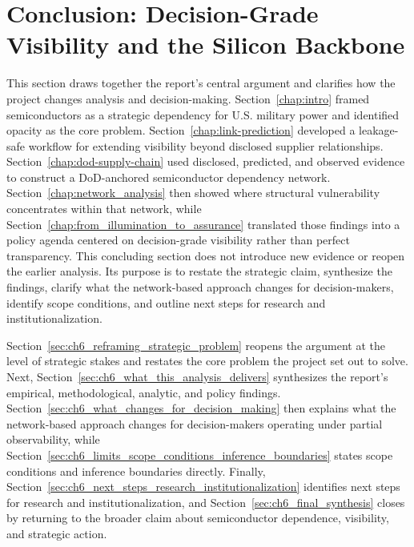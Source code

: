 \chapter{Conclusion: Decision-Grade Visibility and the Silicon Backbone}
\label{chap:conclusion}

This section draws together the report's central argument and clarifies how the project changes analysis and decision-making. Section~\ref{chap:intro} framed semiconductors as a strategic dependency for U.S. military power and identified opacity as the core problem. Section~\ref{chap:link-prediction} developed a leakage-safe workflow for extending visibility beyond disclosed supplier relationships. Section~\ref{chap:dod-supply-chain} used disclosed, predicted, and observed evidence to construct a DoD-anchored semiconductor dependency network. Section~\ref{chap:network_analysis} then showed where structural vulnerability concentrates within that network, while Section~\ref{chap:from_illumination_to_assurance} translated those findings into a policy agenda centered on decision-grade visibility rather than perfect transparency. This concluding section does not introduce new evidence or reopen the earlier analysis. Its purpose is to restate the strategic claim, synthesize the findings, clarify what the network-based approach changes for decision-makers, identify scope conditions, and outline next steps for research and institutionalization.

Section~\ref{sec:ch6_reframing_strategic_problem} reopens the argument at the level of strategic stakes and restates the core problem the project set out to solve. Next, Section~\ref{sec:ch6_what_this_analysis_delivers} synthesizes the report's empirical, methodological, analytic, and policy findings. Section~\ref{sec:ch6_what_changes_for_decision_making} then explains what the network-based approach changes for decision-makers operating under partial observability, while Section~\ref{sec:ch6_limits_scope_conditions_inference_boundaries} states scope conditions and inference boundaries directly. Finally, Section~\ref{sec:ch6_next_steps_research_institutionalization} identifies next steps for research and institutionalization, and Section~\ref{sec:ch6_final_synthesis} closes by returning to the broader claim about semiconductor dependence, visibility, and strategic action.

